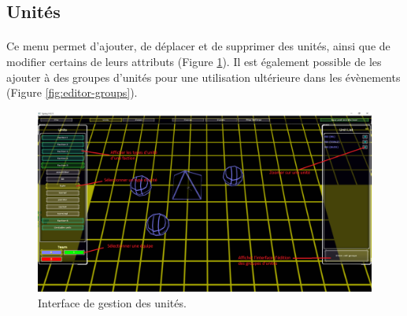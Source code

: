 \documentclass[a4paper]{article}
\begin{document}
\subsection{Unités}
\paragraph{ }
Ce menu permet d'ajouter, de déplacer et de supprimer des unités, ainsi que de modifier certains de leurs attributs (Figure \ref{fig:editor-units}). Il est également possible de les ajouter à des groupes d'unités pour une utilisation ultérieure dans les évènements (Figure \ref{fig:editor-groups}).
\begin{figure}[H]
\centering
\includegraphics[width=\linewidth]{editor-units.png}
\caption{Interface de gestion des unités.}
\label{fig:editor-units}
\end{figure}
\end{document}
